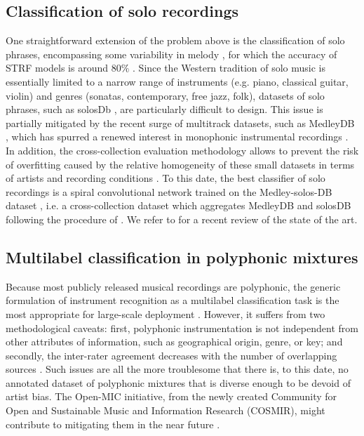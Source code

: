 \documentclass{article}
\makeatletter
\newcommand*{\eg}{e.g.\@\xspace}
\newcommand*{\ie}{i.e.\@\xspace}
\makeatother
\begin{document}
\subsection{Classification of solo recordings}
One straightforward extension of the problem above is the classification of solo phrases, encompassing some variability in melody \cite{krishna2004icassp}, for which the accuracy of STRF models is around $80\%$ \cite{patil2015eurasip}.
Since the Western tradition of solo music is essentially limited to a narrow range of instruments (\eg{} piano, classical guitar, violin) and genres (sonatas, contemporary, free jazz, folk), datasets of solo phrases, such as solosDb \cite{joder2009taslp}, are particularly difficult to design.
This issue is partially mitigated by the recent surge of multitrack datasets, such as MedleyDB \cite{bittner2014ismir}, which has spurred a renewed interest in monophonic instrumental recordings \cite{yip2017ismir}.
In addition, the cross-collection evaluation methodology \cite{livshin2003ismir} allows to prevent the risk of overfitting caused by the relative homogeneity of these small datasets in terms of artists and recording conditions \cite{bogdanov2016ismir}.
To this date, the best classifier of solo recordings is a spiral convolutional network \cite{lostanlen2016ismir} trained on the Medley-solos-DB dataset \cite{lostanlen2018msdb}, \ie{} a cross-collection dataset which aggregates MedleyDB and solosDB following the procedure of \cite{donnelly2015icdmw}.
We refer to \cite{han2017taslp} for a recent review of the state of the art.

\subsection{Multilabel classification in polyphonic mixtures}
Because most publicly released musical recordings are polyphonic, the generic formulation of instrument recognition as a multilabel classification task is the most appropriate for large-scale deployment \cite{martins2007ismir,burred2009icassp}.
However, it suffers from two methodological caveats: first, polyphonic instrumentation is not independent from other attributes of information, such as geographical origin, genre, or key; and secondly, the inter-rater agreement decreases with the number of overlapping sources \cite[chapter 6]{fuhrmann2012phd}.
Such issues are all the more troublesome that there is, to this date, no  annotated dataset of polyphonic mixtures that is diverse enough to be devoid of artist bias.
The Open-MIC initiative, from the newly created Community for Open and Sustainable Music and Information Research (COSMIR), might contribute to mitigating them in the near future \cite{mcfee2016ismir}.
\end{document}
